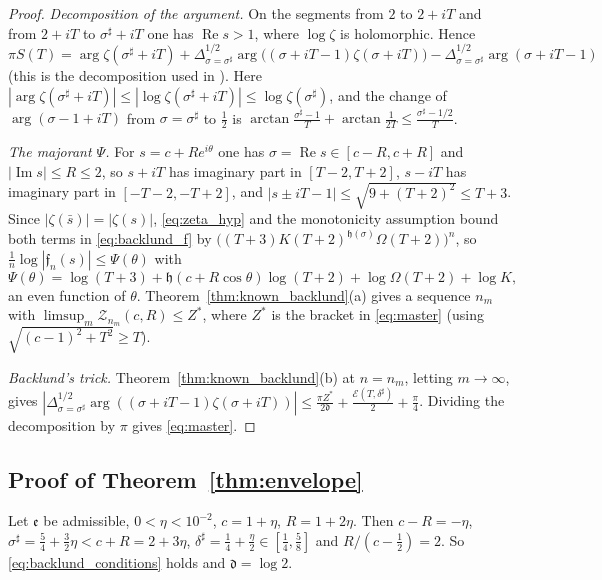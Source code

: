 \documentclass[11pt,a4paper]{article}
\makeatletter
\numberwithin{equation}{section}
\DeclareRobustCommand{\CGref}[1]{\ref{#1}}
\DeclareRobustCommand{\CGeqref}[1]{\eqref{#1}}
\DeclareRobustCommand{\CGcite}[2][]{\if\relax\detokenize{#1}\relax\cite{#2}\else\cite[#1]{#2}\fi}
\let\CG@origref\ref
\let\CG@origeqref\eqref
\newcommand{\CG@gettip}[1]{\@ifundefined{CGTip@#1}{#1}{\csname CGTip@#1\endcsname}}
\newcommand{\CG@getbib}[1]{\@ifundefined{CGBib@#1}{#1}{\csname CGBib@#1\endcsname}}
\DeclareRobustCommand{\CGref}[1]{\pdftooltip{\CG@origref{#1}}{\CG@gettip{#1}}}
\DeclareRobustCommand{\CGeqref}[1]{\pdftooltip{\CG@origeqref{#1}}{\CG@gettip{#1}}}
\DeclareRobustCommand{\CGcite}[2][]{\pdftooltip{\if\relax\detokenize{#1}\relax\cite{#2}\else\cite[#1]{#2}\fi}{\CG@getbib{#2}}}
\theoremstyle{definition}
\theoremstyle{remark}
\makeatother
\begin{document}
\begin{proof}
\emph{Decomposition of the argument.} On the segments from $2$ to $2+iT$ and from $2+iT$ to $\sigma^\sharp+iT$ one has $\operatorname{Re}s>1$, where $\log\zeta$ is holomorphic. Hence
\[
\pi S(T)=\arg\zeta(\sigma^\sharp+iT)+\Delta_{\sigma=\sigma^\sharp}^{1/2}\arg\bigl((\sigma+iT-1)\zeta(\sigma+iT)\bigr)-\Delta_{\sigma=\sigma^\sharp}^{1/2}\arg(\sigma+iT-1)
\]
(this is the decomposition used in \CGcite[\S3]{BellottiWong2025}). Here $|\arg\zeta(\sigma^\sharp+iT)|\le|\log\zeta(\sigma^\sharp+iT)|\le\log\zeta(\sigma^\sharp)$, and the change of $\arg(\sigma-1+iT)$ from $\sigma=\sigma^\sharp$ to $\frac12$ is $\arctan\frac{\sigma^\sharp-1}T+\arctan\frac1{2T}\le\frac{\sigma^\sharp-1/2}T$.

\emph{The majorant $\Psi$.} For $s=c+Re^{i\theta}$ one has $\sigma=\operatorname{Re}s\in[c-R,c+R]$ and $|\operatorname{Im}s|\le R\le2$, so $s+iT$ has imaginary part in $[T-2,T+2]$, $s-iT$ has imaginary part in $[-T-2,-T+2]$, and $|s\pm iT-1|\le\sqrt{9+(T+2)^2}\le T+3$. Since $|\zeta(\bar s)|=|\zeta(s)|$, \CGeqref{eq:zeta_hyp} and the monotonicity assumption bound both terms in \CGeqref{eq:backlund_f} by $\bigl((T+3)K(T+2)^{\mathfrak h(\sigma)}\Omega(T+2)\bigr)^n$, so $\frac1n\log|\mathfrak f_n(s)|\le\Psi(\theta)$ with
\[
\Psi(\theta)=\log(T+3)+\mathfrak h(c+R\cos\theta)\log(T+2)+\log\Omega(T+2)+\log K,
\]
an even function of $\theta$. Theorem~\CGref{thm:known_backlund}(a) gives a sequence $n_m$ with $\limsup_m\mathcal Z_{n_m}(c,R)\le Z^*$, where $Z^*$ is the bracket in \CGeqref{eq:master} (using $\sqrt{(c-1)^2+T^2}\ge T$).

\emph{Backlund's trick.} Theorem~\CGref{thm:known_backlund}(b) at $n=n_m$, letting $m\to\infty$, gives $|\Delta_{\sigma=\sigma^\sharp}^{1/2}\arg((\sigma+iT-1)\zeta(\sigma+iT))|\le\frac{\pi Z^*}{2\mathfrak d}+\frac{\mathcal E(T,\delta^\sharp)}2+\frac\pi4$. Dividing the decomposition by $\pi$ gives \CGeqref{eq:master}.
\end{proof}

\subsection{Proof of Theorem~\ref{thm:envelope}}\label{subsec:proof_envelope}
Let $\mathfrak e$ be admissible, $0<\eta<10^{-2}$, $c=1+\eta$, $R=1+2\eta$. Then $c-R=-\eta$, $\sigma^\sharp=\frac54+\frac32\eta<c+R=2+3\eta$, $\delta^\sharp=\frac14+\frac\eta2\in[\frac14,\frac58]$ and $R/(c-\frac12)=2$. So \CGeqref{eq:backlund_conditions} holds and $\mathfrak d=\log2$.
\end{document}
